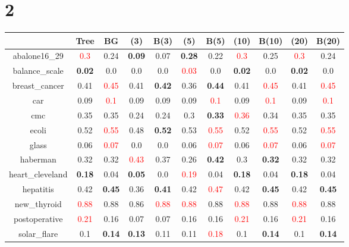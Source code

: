 \documentclass{article}%
\begin{document}
\section*{2}%
\begin{tabular}{c|cccccccccc}%
\hline%
&Tree&BG&(3)&B(3)&(5)&B(5)&(10)&B(10)&(20)&B(20)\\%
\hline%
abalone16\_29&\textcolor{red}{ 
0.3
}&0.24&\textbf{0.09}&0.07&\textbf{0.28}&0.22&\textcolor{red}{ 
0.3
}&0.25&\textcolor{red}{ 
0.3
}&0.24\\%
\hline%
balance\_scale&\textbf{0.02}&0.0&0.0&0.0&\textcolor{red}{ 
0.03
}&0.0&\textbf{0.02}&0.0&\textbf{0.02}&0.0\\%
\hline%
breast\_cancer&0.41&\textcolor{red}{ 
0.45
}&0.41&\textbf{0.42}&0.36&\textbf{0.44}&0.41&\textcolor{red}{ 
0.45
}&0.41&\textcolor{red}{ 
0.45
}\\%
\hline%
car&0.09&\textcolor{red}{ 
0.1
}&0.09&0.09&0.09&\textcolor{red}{ 
0.1
}&0.09&\textcolor{red}{ 
0.1
}&0.09&\textcolor{red}{ 
0.1
}\\%
\hline%
cmc&0.35&0.35&0.24&0.24&0.3&\textbf{0.33}&\textcolor{red}{ 
0.36
}&0.34&0.35&0.35\\%
\hline%
ecoli&0.52&\textcolor{red}{ 
0.55
}&0.48&\textbf{0.52}&0.53&\textcolor{red}{ 
0.55
}&0.52&\textcolor{red}{ 
0.55
}&0.52&\textcolor{red}{ 
0.55
}\\%
\hline%
glass&0.06&\textcolor{red}{ 
0.07
}&0.0&0.0&0.06&\textcolor{red}{ 
0.07
}&0.06&\textcolor{red}{ 
0.07
}&0.06&\textcolor{red}{ 
0.07
}\\%
\hline%
haberman&0.32&0.32&\textcolor{red}{ 
0.43
}&0.37&0.26&\textbf{0.42}&0.3&\textbf{0.32}&0.32&0.32\\%
\hline%
heart\_cleveland&\textbf{0.18}&0.04&\textbf{0.05}&0.0&\textcolor{red}{ 
0.19
}&0.04&\textbf{0.18}&0.04&\textbf{0.18}&0.04\\%
\hline%
hepatitis&0.42&\textbf{0.45}&0.36&\textbf{0.41}&0.42&\textcolor{red}{ 
0.47
}&0.42&\textbf{0.45}&0.42&\textbf{0.45}\\%
\hline%
new\_thyroid&\textcolor{red}{ 
0.88
}&0.88&0.86&\textcolor{red}{ 
0.88
}&\textcolor{red}{ 
0.88
}&0.88&\textcolor{red}{ 
0.88
}&0.88&\textcolor{red}{ 
0.88
}&0.88\\%
\hline%
postoperative&\textcolor{red}{ 
0.21
}&0.16&0.07&0.07&0.16&0.16&\textcolor{red}{ 
0.21
}&0.16&\textcolor{red}{ 
0.21
}&0.16\\%
\hline%
solar\_flare&0.1&\textbf{0.14}&\textbf{0.13}&0.11&0.11&\textcolor{red}{ 
0.18
}&0.1&\textbf{0.14}&0.1&\textbf{0.14}\\%

\end{tabular}
\end{document}
